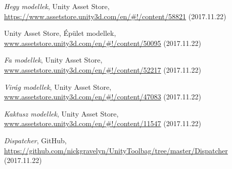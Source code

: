 \begin{thebibliography}{x}
\emph{Hegy modellek}, Unity Asset Store, \\
\url{https://www.assetstore.unity3d.com/en/\#!/content/58821} (2017.11.22)

Unity Asset Store, Épület modellek, \\
\url{www.assetstore.unity3d.com/en/\#!/content/50095} (2017.11.22)

\emph{Fa modellek}, Unity Asset Store, \\
\url{www.assetstore.unity3d.com/en/\#!/content/52217} (2017.11.22)

\emph{Virág modellek}, Unity Asset Store, \\
\url{www.assetstore.unity3d.com/en/\#!/content/47083} (2017.11.22)

\emph{Kaktusz modellek}, Unity Asset Store, \\
\url{www.assetstore.unity3d.com/en/\#!/content/11547} (2017.11.22)

\emph{Dispatcher}, GitHub, \\
\url{https://github.com/nickgravelyn/UnityToolbag/tree/master/Dispatcher} (2017.11.22)

\end{thebibliography}
